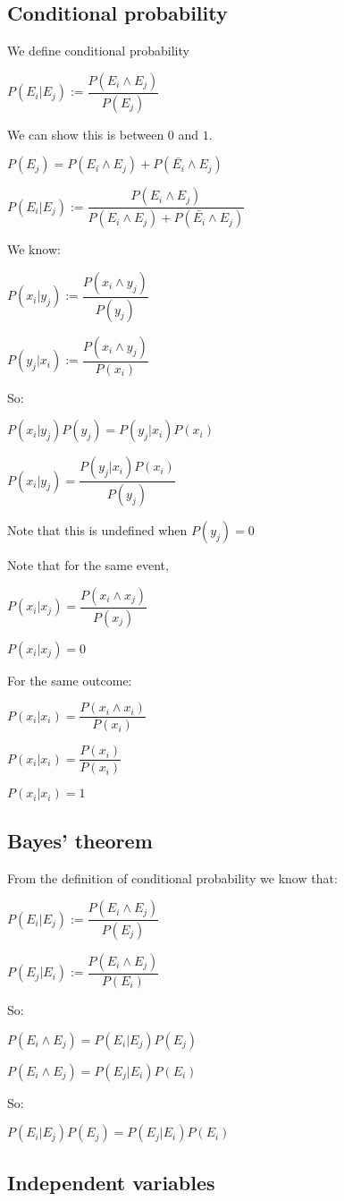 
\subsection{Conditional probability}

We define conditional probability

\(P(E_i|E_j):=\dfrac{P(E_i\land E_j)}{P(E_j)}\)

We can show this is between \(0\) and \(1\).

\(P(E_j)=P(E_i\land E_j)+P(\bar{E_i}\land E_j)\)

\(P(E_i|E_j):=\dfrac{P(E_i\land E_j)}{ P(E_i\land E_j)+P(\bar{E_i}\land E_j)}\)

We know:

\(P(x_i|y_j):=\dfrac{P(x_i \land y_j)}{P(y_j)}\)

\(P(y_j|x_i):=\dfrac{P(x_i \land y_j)}{P(x_i)}\)

So:

\(P(x_i|y_j)P(y_j)=P(y_j|x_i) P(x_i)\)

\(P(x_i|y_j)=\dfrac{P(y_j|x_i) P(x_i)}{P(y_j)}\)

Note that this is undefined when \(P(y_j)=0\)

Note that for the same event, 

\(P(x_i|x_j)=\dfrac{P(x_i\land x_j)}{P(x_j)}\)

\(P(x_i|x_j)=0\)

For the same outcome:

\(P(x_i|x_i)=\dfrac{P(x_i\land x_i)}{P(x_i)}\)

\(P(x_i|x_i)=\dfrac{P(x_i)}{P(x_i)}\)

\(P(x_i|x_i)=1\)

\subsection{Bayes' theorem}

From the definition of conditional probability we know that:

\(P(E_i|E_j):=\dfrac{P(E_i\land E_j)}{P(E_j)}\)

\(P(E_j|E_i):=\dfrac{P(E_i\land E_j)}{P(E_i)}\)

So:

\(P(E_i\land E_j)=P(E_i|E_j)P(E_j)\)

\(P(E_i\land E_j)=P(E_j|E_i)P(E_i)\)

So:

\(P(E_i|E_j)P(E_j)=P(E_j|E_i)P(E_i)\)

\subsection{Independent variables}

